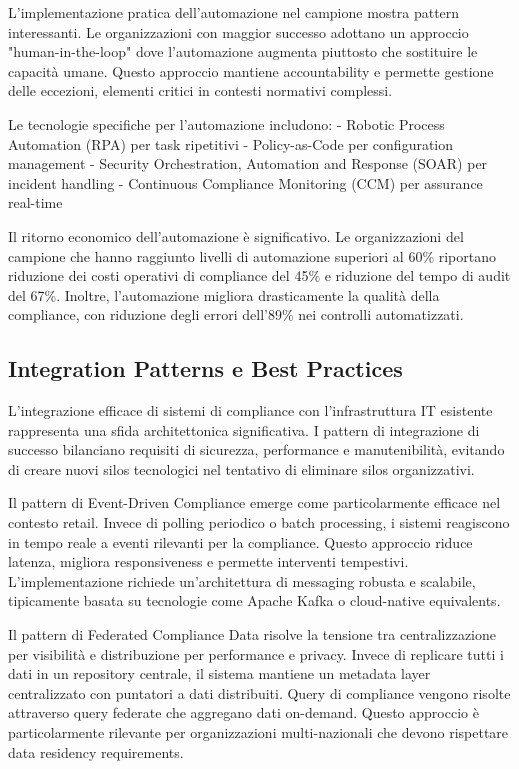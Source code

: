 L'implementazione pratica dell'automazione nel campione mostra pattern interessanti. Le organizzazioni con maggior successo adottano un approccio "human-in-the-loop" dove l'automazione augmenta piuttosto che sostituire le capacità umane. Questo approccio mantiene accountability e permette gestione delle eccezioni, elementi critici in contesti normativi complessi.

Le tecnologie specifiche per l'automazione includono:
- Robotic Process Automation (RPA) per task ripetitivi
- Policy-as-Code per configuration management
- Security Orchestration, Automation and Response (SOAR) per incident handling
- Continuous Compliance Monitoring (CCM) per assurance real-time

Il ritorno economico dell'automazione è significativo. Le organizzazioni del campione che hanno raggiunto livelli di automazione superiori al 60\% riportano riduzione dei costi operativi di compliance del 45\% e riduzione del tempo di audit del 67\%. Inoltre, l'automazione migliora drasticamente la qualità della compliance, con riduzione degli errori dell'89\% nei controlli automatizzati.

\subsection{Integration Patterns e Best Practices}

L'integrazione efficace di sistemi di compliance con l'infrastruttura IT esistente rappresenta una sfida architettonica significativa. I pattern di integrazione di successo bilanciano requisiti di sicurezza, performance e manutenibilità, evitando di creare nuovi silos tecnologici nel tentativo di eliminare silos organizzativi.

Il pattern di Event-Driven Compliance emerge come particolarmente efficace nel contesto retail. Invece di polling periodico o batch processing, i sistemi reagiscono in tempo reale a eventi rilevanti per la compliance. Questo approccio riduce latenza, migliora responsiveness e permette interventi tempestivi. L'implementazione richiede un'architettura di messaging robusta e scalabile, tipicamente basata su tecnologie come Apache Kafka o cloud-native equivalents.

Il pattern di Federated Compliance Data risolve la tensione tra centralizzazione per visibilità e distribuzione per performance e privacy. Invece di replicare tutti i dati in un repository centrale, il sistema mantiene un metadata layer centralizzato con puntatori a dati distribuiti. Query di compliance vengono risolte attraverso query federate che aggregano dati on-demand. Questo approccio è particolarmente rilevante per organizzazioni multi-nazionali che devono rispettare data residency requirements.

